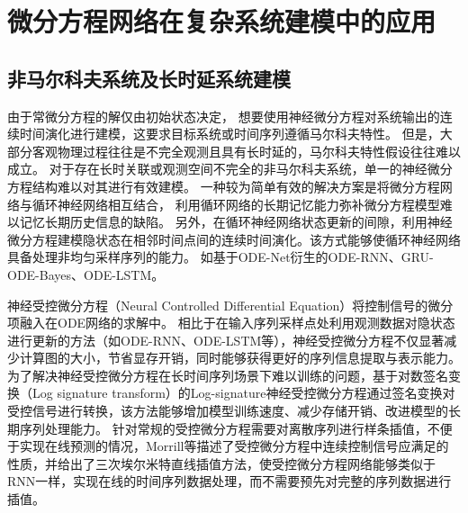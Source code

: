 


\section{微分方程网络在复杂系统建模中的应用}
\subsection{非马尔科夫系统及长时延系统建模}
由于常微分方程的解仅由初始状态决定，
想要使用神经微分方程对系统输出的连续时间演化进行建模，这要求目标系统或时间序列遵循马尔科夫特性。
但是，大部分客观物理过程往往是不完全观测且具有长时延的，马尔科夫特性假设往往难以成立。
对于存在长时关联或观测空间不完全的非马尔科夫系统，单一的神经微分方程结构难以对其进行有效建模。
一种较为简单有效的解决方案是将微分方程网络与循环神经网络相互结合，
利用循环网络的长期记忆能力弥补微分方程模型难以记忆长期历史信息的缺陷。
另外，在循环神经网络状态更新的间隙，利用神经微分方程建模隐状态在相邻时间点间的连续时间演化。该方式能够使循环神经网络具备处理非均匀采样序列的能力。
如基于ODE-Net衍生的ODE-RNN\cite{10.5555/3454287.3454765}、GRU-ODE-Bayes\cite{brouwer2019gru}、ODE-LSTM\cite{lechner2020learning}。

神经受控微分方程（Neural Controlled Differential Equation）\cite{kidger2020neural}将控制信号的微分项融入在ODE网络的求解中。
相比于在输入序列采样点处利用观测数据对隐状态进行更新的方法（如ODE-RNN、ODE-LSTM等），神经受控微分方程不仅显著减少计算图的大小，节省显存开销，同时能够获得更好的序列信息提取与表示能力。
为了解决神经受控微分方程在长时间序列场景下难以训练的问题，基于对数签名变换（Log signature transform）的Log-signature神经受控微分方程\cite{morrill2021neural}通过签名变换对受控信号进行转换，该方法能够增加模型训练速度、减少存储开销、改进模型的长期序列处理能力。
针对常规的受控微分方程需要对离散序列进行样条插值，不便于实现在线预测的情况，Morrill等\cite{morrill2021online}描述了受控微分方程中连续控制信号应满足的性质，并给出了三次埃尔米特直线插值方法，使受控微分方程网络能够类似于RNN一样，实现在线的时间序列数据处理，而不需要预先对完整的序列数据进行插值。

